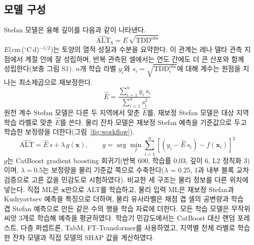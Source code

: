 \subsection{모델 구성}
Stefan 모델은 융해 깊이를 다음과 같이 나타낸다.
\begin{equation}
\widehat{\mathrm{ALT}}_{\mathrm{S}} = E\,\sqrt{\mathrm{TDD}^{\mathrm{obs}}}
\label{eq:stefan}
\end{equation}
$E$(cm\,($^\circ$C\,d)$^{-1/2}$)는 토양의 열적 성질과 수분을 요약한다\cite{Stefan1891,Riseborough2008}. 이 관계는 레나 델타 관측 지점에서 계절 안에 잘 성립하며, 반복 관측된 셀에서는 연도 간에도 더 큰 산포와 함께 성립한다(보충 그림 S1). $n$개 학습 라벨 $y_i$와 $s_i = \sqrt{\mathrm{TDD}^{\mathrm{obs}}_i}$에 대해 계수는 원점을 지나는 최소제곱으로 재보정한다.
\begin{equation}
\hat{E} = \frac{\sum_{i=1}^{n} y_i\, s_i}{\sum_{i=1}^{n} s_i^{2}}
\label{eq:E}
\end{equation}
원천 계수 Stefan 모델은 다른 두 지역에서 맞춘 $\hat{E}$를, 재보정 Stefan 모델은 대상 지역 학습 라벨로 맞춘 $\hat{E}$를 쓴다. 물리 잔차 모델은 재보정 Stefan 예측을 기준값으로 두고 학습한 보정량을 더한다(그림~\ref{fig:workflow}).
\begin{equation}
\widehat{\mathrm{ALT}} = \hat{E}\, s + \lambda\, g(\mathbf{x}), \qquad g = \arg\min_{f} \sum_{i=1}^{n} \left[ \left( y_i - \hat{E}\, s_i \right) - f(\mathbf{x}_i) \right]^{2}
\label{eq:residual}
\end{equation}
$g$는 CatBoost gradient boosting 회귀기\cite{Prokhorenkova2018}(반복 600, 학습률 0.03, 깊이 6, L2 정칙화 3)이며, $\lambda=0.5$는 보정량을 물리 기준값 쪽으로 수축한다($\lambda$ = 0.25, 1과 내부 블록 교차검증으로 고른 값을 민감도로 시험하였다). 비교한 세 구조는 물리 정보를 다른 위치에 넣는다. 직접 ML은 $\mathbf{x}$만으로 ALT를 학습하고, 물리 입력 ML은 재보정 Stefan과 Kudryavtsev\cite{Kudryavtsev1974} 예측을 특징으로 더하며, 물리 유사라벨은 채점 겹 셀의 공변량과 학습 겹 Stefan 예측으로 만든 같은 수의 행을 학습 자료에 더한다. 모든 학습 모델은 무작위 씨앗 3개로 학습해 예측을 평균하였다. 학습기 민감도에서는 CatBoost 대신 랜덤 포레스트, 다층 퍼셉트론, TabM, FT-Transformer\cite{Gorishniy2021,Gorishniy2025,Holzmuller2024}를 사용하였고, 지역별 전체 라벨로 학습한 잔차 모델과 직접 모델의 SHAP 값\cite{Lundberg2017}을 계산하였다.


